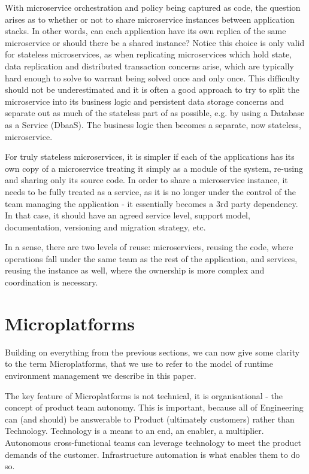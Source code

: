 \documentclass[reprint,amsmath,amssymb,aps]{revtex4-1}
\begin{document}
With microservice orchestration and policy being captured as code, the question arises as to whether or not to share microservice instances between application stacks. In other words, can each application have its own replica of the same microservice or should there be a shared instance? Notice this choice is only valid for stateless microservices, as when replicating microservices which hold state, data replication and distributed transaction concerns arise, which are typically hard enough to solve to warrant being solved once and only once. This difficulty should not be underestimated and it is often a good approach to try to split the microservice into its business logic and persistent data storage concerns and separate out as much of the stateless part of as possible, e.g. by using a Database as a Service (DbaaS). The business logic then becomes a separate, now stateless, microservice.

For truly stateless microservices, it is simpler if each of the applications has its own copy of a microservice treating it simply as a module of the system, re-using and sharing only its source code. In order to share a microservice instance, it needs to be fully treated as a service, as it is no longer under the control of the team managing the application - it essentially becomes a 3rd party dependency. In that case, it should have an agreed service level, support model, documentation, versioning and migration strategy, etc. 

In a sense, there are two levels of reuse: microservices, reusing the code, where operations fall under the same team as the rest of the application, and services, reusing the instance as well, where the ownership is more complex and coordination is necessary.

\section{Microplatforms}
\label{sec:microplatforms}

Building on everything from the previous sections, we can now give some clarity to the term Microplatforms, that we use to refer to the model of runtime environment management we describe in this paper.

The key feature of Microplatforms is not technical, it is organisational - the concept of product team autonomy. This is important, because all of Engineering can (and should) be answerable to Product (ultimately customers) rather than Technology. Technology is a means to an end, an enabler, a multiplier. Autonomous cross-functional teams can leverage technology to meet the product demands of the customer. Infrastructure automation is what enables them to do so.
\end{document}
